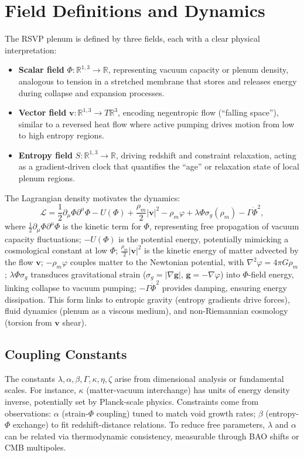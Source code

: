 \documentclass[11pt]{article}
\theoremstyle{plain}
\theoremstyle{definition}
\begin{document}
\section{Field Definitions and Dynamics}
The RSVP plenum is defined by three fields, each with a clear physical interpretation:
\begin{itemize}
    \item \textbf{Scalar field} $\Phi: \mathbb{R}^{1,3} \to \mathbb{R}$, representing vacuum capacity or plenum density, analogous to tension in a stretched membrane that stores and releases energy during collapse and expansion processes.
    \item \textbf{Vector field} $\bm{v}: \mathbb{R}^{1,3} \to T\mathbb{R}^3$, encoding negentropic flow (``falling space''), similar to a reversed heat flow where active pumping drives motion from low to high entropy regions.
    \item \textbf{Entropy field} $S: \mathbb{R}^{1,3} \to \mathbb{R}$, driving redshift and constraint relaxation, acting as a gradient-driven clock that quantifies the ``age'' or relaxation state of local plenum regions.
\end{itemize}
The Lagrangian density motivates the dynamics:
\begin{equation}
\mathcal{L} = \frac{1}{2} \partial_\mu \Phi \partial^\mu \Phi - U(\Phi) + \frac{\rho_m}{2} |\bm{v}|^2 - \rho_m \varphi + \lambda \Phi \sigma_g(\rho_m) - \Gamma \dot{\Phi}^2,
\label{eq:L}
\end{equation}
where $\frac{1}{2} \partial_\mu \Phi \partial^\mu \Phi$ is the kinetic term for $\Phi$, representing free propagation of vacuum capacity fluctuations; $-U(\Phi)$ is the potential energy, potentially mimicking a cosmological constant at low $\Phi$; $\frac{\rho_m}{2} |\bm{v}|^2$ is the kinetic energy of matter advected by the flow $\bm{v}$; $-\rho_m \varphi$ couples matter to the Newtonian potential, with $\nabla^2 \varphi = 4\pi G \rho_m$; $\lambda \Phi \sigma_g$ transduces gravitational strain ($\sigma_g = |\nabla \bm{g}|$, $\bm{g} = -\nabla \varphi$) into $\Phi$-field energy, linking collapse to vacuum pumping; $-\Gamma \dot{\Phi}^2$ provides damping, ensuring energy dissipation.
This form links to entropic gravity (entropy gradients drive forces), fluid dynamics (plenum as a viscous medium), and non-Riemannian cosmology (torsion from $\bm{v}$ shear).
\subsection{Coupling Constants}
The constants $\lambda, \alpha, \beta, \Gamma, \kappa, \eta, \zeta$ arise from dimensional analysis or fundamental scales. For instance, $\kappa$ (matter-vacuum interchange) has units of energy density inverse, potentially set by Planck-scale physics. Constraints come from observations: $\alpha$ (strain-$\Phi$ coupling) tuned to match void growth rates; $\beta$ (entropy-$\Phi$ exchange) to fit redshift-distance relations. To reduce free parameters, $\lambda$ and $\alpha$ can be related via thermodynamic consistency, measurable through BAO shifts or CMB multipoles.
\end{document}
